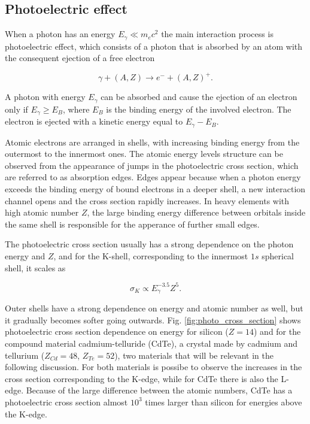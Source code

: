 \subsection{Photoelectric effect}
When a photon has an energy $E_{\gamma} \ll m_e c^2$ the main interaction process is photoelectric effect, which consists of a photon that is absorbed by an atom with the consequent ejection of a free electron

\begin{equation}
\gamma + (A, Z) \rightarrow e^- + (A, Z)^+.
\end{equation}

A photon with energy $E_{\gamma}$ can be absorbed and cause the ejection of an electron only if $E_{\gamma} \geq E_B$, where $E_B$ is the binding energy of the involved electron. The electron is ejected with a kinetic energy equal to $E_{\gamma} - E_B$.

Atomic electrons are arranged in shells, with increasing binding energy from the outermost to the innermost ones. The atomic energy levels structure can be observed from the appearance of jumps in the photoelectric cross section, which are referred to as absorption edges. Edges appear because when a photon energy exceeds the binding energy of bound electrons in a deeper shell, a new interaction channel opens and the cross section rapidly increases. In heavy elements with high atomic number $Z$, the large binding energy difference between orbitals inside the same shell is responsible for the apperance of further small edges.

The photoelectric cross section usually has a strong dependence on the photon energy and $Z$, and for the K-shell, corresponding to the innermost $1s$ spherical shell, it scales as

\begin{equation}
\sigma_{K} \propto E_{\gamma}^{-3.5}Z^5.
\end{equation}

Outer shells have a strong dependence on energy and atomic number as well, but it gradually becomes softer going outwards. Fig. \ref{fig:photo_cross_section} shows photoelectric cross section dependence on energy for silicon ($Z = 14$) and for the compound material cadmium-telluride (CdTe), a crystal made by cadmium and tellurium ($Z_{Cd} = 48$, $Z_{Te} = 52$), two materials that will be relevant in the following discussion. For both materials is possibe to observe the increases in the cross section corresponding to the K-edge, while for CdTe there is also the L-edge. Because of the large difference between the atomic numbers, CdTe has a photoelectric cross section almost $10^3$ times larger than silicon for energies above the K-edge.

